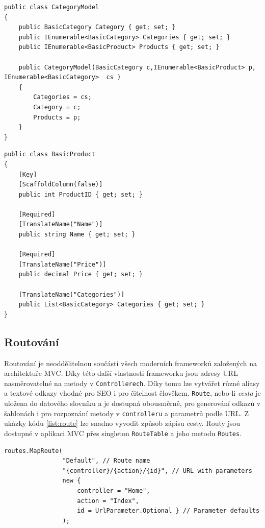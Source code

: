 \documentclass[11pt,twoside,a4paper]{book}
\begin{document}
\begin{lstlisting}[float=h!,language=CSharp, caption={Model z více entit}, label=list:model]
public class CategoryModel
{
	public BasicCategory Category { get; set; }
	public IEnumerable<BasicCategory> Categories { get; set; }
	public IEnumerable<BasicProduct> Products { get; set; } 
	
	public CategoryModel(BasicCategory c,IEnumerable<BasicProduct> p, IEnumerable<BasicCategory>  cs )
	{
		Categories = cs;
		Category = c;
		Products = p;
	}
}
\end{lstlisting}

\begin{lstlisting}[float=h!,language=CSharp, caption={Entita a zároveň Model}, label=list:entita]
public class BasicProduct
{
    [Key]
    [ScaffoldColumn(false)]
    public int ProductID { get; set; }

    [Required]
    [TranslateName("Name")]
    public string Name { get; set; }

    [Required]
    [TranslateName("Price")]
    public decimal Price { get; set; }

    [TranslateName("Categories")]
    public List<BasicCategory> Categories { get; set; }
}
\end{lstlisting}


\subsection{Routování}
\label{sec:routovani}

Routování je neoddělitelnou součástí všech moderních frameworků založených na architektuře MVC. Díky této další vlastnosti frameworku jsou adresy URL nasměrovatelné na metody v \texttt{Controllerech}. Díky tomu lze vytvářet různé aliasy a textové odkazy vhodné pro SEO i pro čitelnost člověkem. \texttt{Route}, nebo-li \textit{cesta} je uložena do datového slovníku a je dostupná obousměrně, pro generování odkazů v šablonách i pro rozpoznání metody v \texttt{controlleru} a parametrů podle URL. Z ukázky kódu \ref{list:route} lze snadno vyvodit způsob zápisu cesty. Routy jsou dostupné v aplikaci MVC přes singleton \texttt{RouteTable} a jeho metodu \texttt{Routes}.

\begin{lstlisting}[float=h!,language=CSharp, caption={Route}, label=list:route]
routes.MapRoute(
				"Default", // Route name
				"{controller}/{action}/{id}", // URL with parameters
				new { 
					controller = "Home", 
					action = "Index", 
					id = UrlParameter.Optional } // Parameter defaults
				);
\end{lstlisting}
\end{document}
